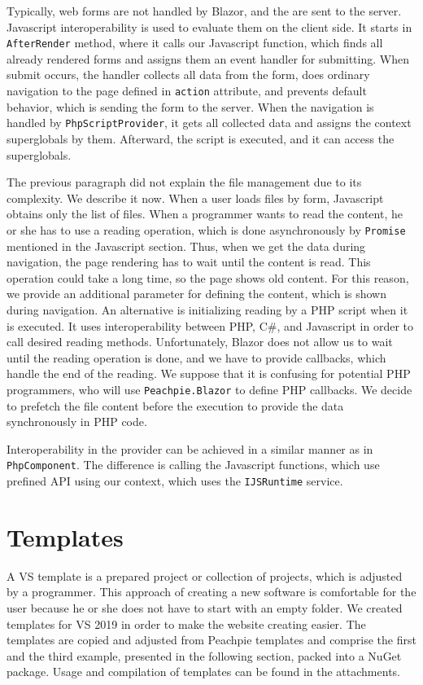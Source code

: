 Typically, web forms are not handled by Blazor, and the are sent to the server.
Javascript interoperability is used to evaluate them on the client side.
It starts in \texttt{AfterRender} method, where it calls our Javascript function, which finds all already rendered forms and assigns them an event handler for submitting.
When submit occurs, the handler collects all data from the form, does ordinary navigation to the page defined in \texttt{action} attribute, and prevents default behavior, which is sending the form to the server.
When the navigation is handled by \texttt{PhpScriptProvider}, it gets all collected data and assigns the context superglobals by them.
Afterward, the script is executed, and it can access the superglobals.
\par
The previous paragraph did not explain the file management due to its complexity.
We describe it now.
When a user loads files by form, Javascript obtains only the list of files. 
When a programmer wants to read the content, he or she has to use a reading operation, which is done asynchronously by \texttt{Promise} mentioned in the Javascript section.
Thus, when we get the data during navigation, the page rendering has to wait until the content is read.
This operation could take a long time, so the page shows old content.
For this reason, we provide an additional parameter for defining the content, which is shown during navigation.
An alternative is initializing reading by a PHP script when it is executed.
It uses interoperability between PHP, C\#, and Javascript in order to call desired reading methods.
Unfortunately, Blazor does not allow us to wait until the reading operation is done, and we have to provide callbacks, which handle the end of the reading.
We suppose that it is confusing for potential PHP programmers, who will use \texttt{Peachpie.Blazor} to define PHP callbacks.
We decide to prefetch the file content before the execution to provide the data synchronously in PHP code.
\par
Interoperability in the provider can be achieved in a similar manner as in \texttt{PhpComponent}.
The difference is calling the Javascript functions, which use prefined API using our context, which uses the \texttt{IJSRuntime} service.

\section{Templates}

A \ac{VS} template is a prepared project or collection of projects, which is adjusted by a programmer.
This approach of creating a new software is comfortable for the user because he or she does not have to start with an empty folder.
We created templates for VS 2019 in order to make the website creating easier.
The templates are copied and adjusted from Peachpie templates \cite{online:templates} and comprise the first and the third example, presented in the following section, packed into a NuGet package.
Usage and compilation of templates can be found in the attachments.
 